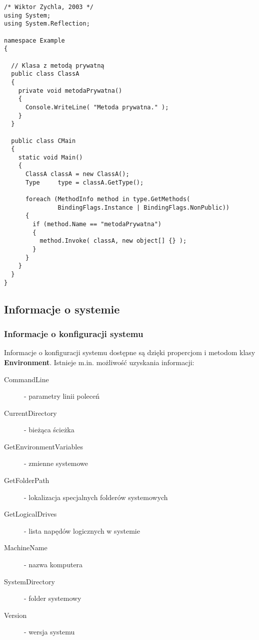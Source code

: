 \begin{scriptsize}
\begin{verbatim}
/* Wiktor Zychla, 2003 */
using System;
using System.Reflection;

namespace Example
{  

  // Klasa z metodą prywatną
  public class ClassA
  {
    private void metodaPrywatna()
    {
      Console.WriteLine( "Metoda prywatna." );
    }
  }

  public class CMain
  {
    static void Main()
    {
      ClassA classA = new ClassA();
      Type     type = classA.GetType();

      foreach (MethodInfo method in type.GetMethods(
               BindingFlags.Instance | BindingFlags.NonPublic))
      {
        if (method.Name == "metodaPrywatna")
        {
          method.Invoke( classA, new object[] {} );
        }
      }
    }
  }
}
\end{verbatim}
\end{scriptsize}

\subsection{Informacje o systemie}

\subsubsection{Informacje o konfiguracji systemu}

Informacje o konfiguracji systemu dostępne są dzięki propercjom i metodom klasy {\bf Environment}.
Istnieje m.in. możliwość uzyskania informacji:

\begin{description}
\item [CommandLine] - parametry linii poleceń
\item [CurrentDirectory] - bieżąca ścieżka 
\item [GetEnvironmentVariables] - zmienne systemowe
\item [GetFolderPath] - lokalizacja specjalnych folderów systemowych 
\item [GetLogicalDrives] - lista napędów logicznych w systemie
\item [MachineName] - nazwa komputera
\item [SystemDirectory] - folder systemowy
\item [Version] - wersja systemu
\end{description}

